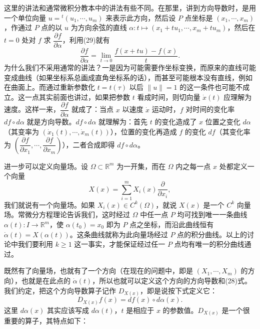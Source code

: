 这里的讲法和通常微积分教本中的讲法有些不同。在那里，讲到方向导数时，是用一个单位向量 $u={}^t(u_1,\cdots,u_m)$ 来表示此方向，然后设 $P$ 点坐标是 $(x_1,\cdots,x_m)$，作通过 $P$ 点的以 $u$ 为方向余弦的直线 $\alpha:t\mapsto(x_1+tu_1,\cdots,x_m+tu_m)$，然后在 $t=0$ 处对 $f$ 求 $\dfrac{\partial f}{\partial\alpha}$，利用(29)就有
\[
 \frac{\partial f}{\partial\alpha}
 =\lim_{t\to0}\frac{f(x+tu)-f(x)}{t}.
\]
为什么我们不采用通常的讲法？一是因为可能需要作坐标变换，而原来的直线可能变成曲线（如果坐标系总画成直角坐标系的话），而甚至可能根本没有直线，例如在曲面上。而通过重新参数化 $t=t(\tau)$ 以后 $\lVert u\rVert=1$ 的这一条件也可能不成立。这一点其实前面也讲过，如果把参数 $t$ 看成时间，则切向量 $\dot x(t)$ 应理解为速度。这样一来，$\dfrac{\partial f}{\partial\alpha}$ 就成了：当点 $x$ 以速度 $\dot x$ 运动时，$f$ 对时间的变化率 $df\circ d\alpha$ 就是方向导数。$df\circ d\alpha$ 就理解为：首先 $t$ 的变化造成了 $x$ 位置之变化 $d\alpha$（其变率为 $(\dot x_1(t),\cdots,\dot x_m(t))$），位置的变化再造成 $f$ 的变化 $df$（其变化率为 $(\dfrac{\partial f}{\partial x_1},\cdots,\dfrac{\partial f}{\partial x_m})$），二者合成即得 $df\circ d\alpha$。

进一步可以定义向量场。设 $\Omega\subset\mathbb R^m$ 为一开集，而在 $\Omega$ 内之每一点 $x$ 处都定义一个向量
\[
 X(x)=\sum_{i=1}^m X_i(x)\frac{\partial}{\partial x_i},
\]
我们就说有一个向量场。如果 $X_i(x)\in C^k(\Omega)$，就说 $X(x)$ 是一个 $C^k$ 向量场。常微分方程理论告诉我们，这时经过 $\Omega$ 中任一点 $P$ 均可找到唯一一条曲线 $\alpha(t):I\to\mathbb R^m$，使 $\alpha(t_0)=x_0$ 即为 $P$ 点之坐标，而沿此曲线恒有 $\dot\alpha(t)=X(\alpha(t))$。这条曲线就称为此向量场经过 $P$ 点的积分曲线。以上的讨论中我们要利用 $k\ge1$ 这一事实，才能保证经过任一 $P$ 点均有唯一的积分曲线通过。

既然有了向量场，也就有了一个方向（在现在的问题中，即是 $(X_1,\cdots,X_m)$ 的方向），也就是在此点的 $\dot\alpha(t)$，所以也就可以定义这个方向的方向导数和(28)式。我们约定，把这个方向导数算子记作 $D_{X(x)}$，即是说按下式定义它：
\begin{equation}
 D_{X(x)}f(x)=df(x)\circ d\alpha(x).
 \tag{30}
\end{equation}
这里 $d\alpha(x)$ 其实应该写成 $d\alpha(t)$，$t$ 是相应于 $x$ 的参数值。$D_{X(x)}$ 是一个很重要的算子，其特点如下：

